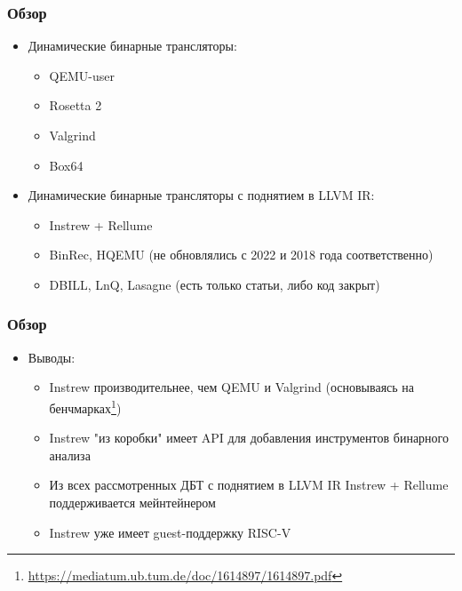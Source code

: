 \documentclass{beamer}
\begin{document}
\begin{frame}
  \frametitle{Обзор}
  \begin{itemize}
    \item Динамические бинарные трансляторы:
          \begin{itemize}
            \item QEMU-user
            \item Rosetta 2
            \item Valgrind
            \item Box64
          \end{itemize}
    \item Динамические бинарные трансляторы с поднятием в LLVM IR:
          \begin{itemize}
            \item Instrew + Rellume
	    \item BinRec, HQEMU (не обновлялись с 2022 и 2018 года соответственно)
	    \item DBILL, LnQ, Lasagne (есть только статьи, либо код закрыт)
          \end{itemize}
  \end{itemize}
\end{frame}

\begin{frame}
  \frametitle{Обзор}
  \begin{itemize}
    \item Выводы:
          \begin{itemize}
	      \item Instrew производительнее, чем QEMU и Valgrind (основываясь на бенчмарках\footnote{\href{https://mediatum.ub.tum.de/doc/1614897/1614897.pdf}{https://mediatum.ub.tum.de/doc/1614897/1614897.pdf}})
	    \item Instrew "из коробки" имеет API для добавления инструментов бинарного анализа
	    \item Из всех рассмотренных ДБТ с поднятием в LLVM IR Instrew + Rellume поддерживается мейнтейнером
	    \item Instrew уже имеет guest-поддержку RISC-V
          \end{itemize}
  \end{itemize}
\end{frame}
\end{document}
